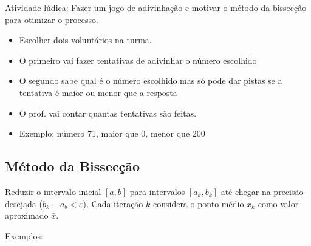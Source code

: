\documentclass[a4paper]{article}
\begin{document}
Atividade lúdica: Fazer um jogo de adivinhação e motivar o método da
bissecção para otimizar o processo.


\begin{itemize}
\item Escolher dois voluntários na turma.
\item O primeiro vai fazer tentativas de adivinhar o número escolhido
\item O segundo sabe qual é o número escolhido mas só pode dar pistas
  se a tentativa é maior ou menor que a resposta
\item O prof. vai contar quantas tentativas são feitas.
\item Exemplo: número 71, maior que 0, menor que 200
\end{itemize}

\clearpage
\subsection*{Método da Bissecção}

Reduzir o intervalo inicial $[a,b]$ para intervalos $[a_k,b_k]$ até
chegar na precisão desejada ($b_k - a_b < \varepsilon$). Cada iteração
$k$ considera o ponto médio $x_k$ como valor aproximado $\bar{x}$.

\bigskip
\begin{center}
\end{center}
\bigskip

Exemplos: 
\end{document}
